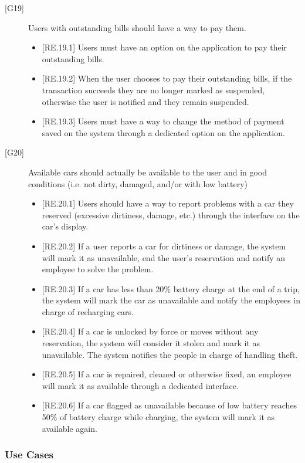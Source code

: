\documentclass[english]{article}
\begin{document}
\begin{description}
\item[{[G19]}]{Users with outstanding bills should have a way to pay them.
\begin{itemize}
	\item{[RE.19.1] Users must have an option on the application to pay their outstanding bills.}
	\item{[RE.19.2] When the user chooses to pay their outstanding bills, if the transaction succeeds they are no longer marked as suspended, otherwise the user is notified and they remain suspended.}
	\item{[RE.19.3] Users must have a way to change the method of payment saved on the system through a dedicated option on the application.}
\end{itemize}
}

\item[{[G20]}]{Available cars should actually be available to the user and in good conditions (i.e. not dirty, damaged, and/or with low battery)
\begin{itemize}
	\item{[RE.20.1] Users should have a way to report problems with a car they reserved (excessive dirtiness, damage, etc.) through the interface on the car's display.}
	\item{[RE.20.2] If a user reports a car for dirtiness or damage, the system will mark it as unavailable, end the user's reservation and notify an employee to solve the problem.}
	\item{[RE.20.3] If a car has less than 20\% battery charge at the end of a trip, the system will mark the car as unavailable and notify the employees in charge of recharging cars.}
	\item{[RE.20.4] If a car is unlocked by force or moves without any reservation, the system will consider it stolen and mark it as unavailable. The system notifies the people in charge of handling theft.}
	\item{[RE.20.5] If a car is repaired, cleaned or otherwise fixed, an employee will mark it as available through a dedicated interface.}
	\item{[RE.20.6] If a car flagged as unavailable because of low battery reaches 50\% of battery charge while charging, the system will mark it as available again.}
\end{itemize}
}

\end{description}

\newpage
\subsubsection{Use Cases}
\end{document}
